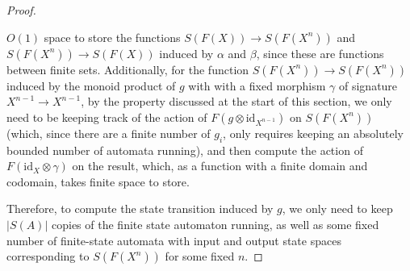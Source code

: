 \documentclass[10pt,a4paper]{amsart}
\begin{document}
\begin{proof}
\begin{itemize}
$O(1)$ space to store the functions $S(F(X)) \to S(F(X^n))$ and
$S(F(X^n)) \to S(F(X))$ induced by $\alpha$ and $\beta$, since these
are functions between finite sets. Additionally, for the function
$S(F(X^n)) \to S(F(X^n))$ induced by the monoid product of $g$
with with a fixed morphism
$\gamma$ of signature $X^{n-1} \to X^{n-1}$, by
the property discussed at the start of this section, we only need to
be keeping track of the action of $F(g \otimes \mathrm{id}_{X^{n-1}})$
on $S(F(X^n))$ (which, since there are a finite number of
$g_i$, only requires keeping an absolutely bounded number of automata
running), and then compute the action of
$F(\mathrm{id}_X\otimes \gamma)$ on the result, which, as a function
with a finite domain and codomain, takes finite space to store.
\end{itemize}
Therefore, to compute the state transition induced by $g$, we only
need to keep $|S(A)|$ copies of the finite state automaton running,
as well as some fixed number of
finite-state automata with input and output
state spaces corresponding to
$S(F(X^n))$ for some fixed $n$.
\end{proof}
\end{document}
